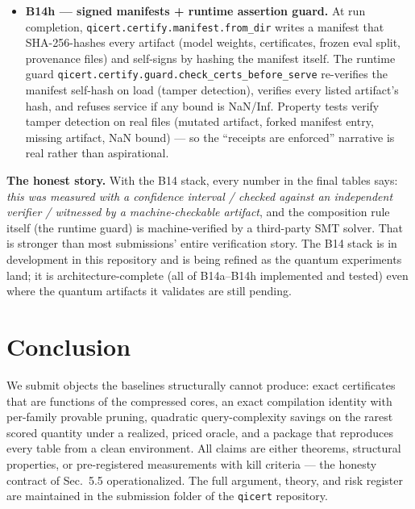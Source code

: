 \documentclass[conference,10pt]{IEEEtran}
\begin{document}
\begin{itemize}
\item \textbf{B14h --- signed manifests + runtime assertion guard.} At run
completion, \texttt{qicert.certify.manifest.from\_dir} writes a manifest that
SHA-256-hashes every artifact (model weights, certificates, frozen eval split,
provenance files) and self-signs by hashing the manifest itself. The runtime
guard \texttt{qicert.certify.guard.check\_certs\_before\_serve} re-verifies
the manifest self-hash on load (tamper detection), verifies every listed
artifact's hash, and refuses service if any bound is NaN/Inf. Property tests
verify tamper detection on real files (mutated artifact, forked manifest entry,
missing artifact, NaN bound) --- so the ``receipts are enforced'' narrative is
real rather than aspirational.
\end{itemize}

\textbf{The honest story.} With the B14 stack, every number in the final tables
says: \emph{this was measured with a confidence interval / checked against an
independent verifier / witnessed by a machine-checkable artifact}, and the
composition rule itself (the runtime guard) is machine-verified by a third-party
SMT solver. That is stronger than most submissions' entire verification story.
The B14 stack is in development in this repository and is being refined as the
quantum experiments land; it is architecture-complete (all of B14a--B14h
implemented and tested) even where the quantum artifacts it validates are still
pending.

\section{Conclusion}

We submit objects the baselines structurally cannot produce: exact certificates
that are functions of the compressed cores, an exact compilation identity with
per-family provable pruning, quadratic query-complexity savings on the rarest
scored quantity under a realized, priced oracle, and a package that reproduces
every table from a clean environment.
All claims are either theorems, structural properties, or pre-registered
measurements with kill criteria --- the honesty contract of Sec.~5.5
operationalized. The full argument, theory, and risk register are maintained in
the submission folder of the \texttt{qicert} repository.
\end{document}

